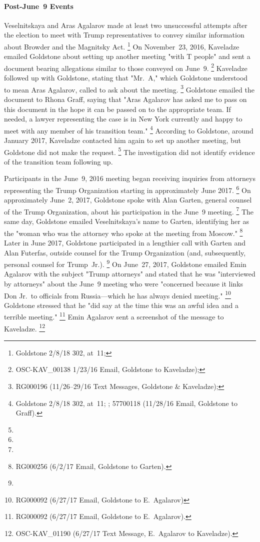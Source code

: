 \paragraph{Post-June~9 Events}

Veselnitskaya and Aras Agalarov made at least two unsuccessful attempts after the election to meet with Trump representatives to convey similar information about Browder and the Magnitsky Act.%
\footnote{Goldstone 2/8/18 302, at~11; }
On November~23, 2016, Kaveladze emailed Goldstone about setting up another meeting "with T people" and sent a document bearing allegations similar to those conveyed on June~9.%
\footnote{OSC-KAV\_00138 1/23/16 Email, Goldstone to Kaveladze); }
Kaveladze followed up with Goldstone, stating that "Mr.~A," which Goldstone understood to mean Aras Agalarov, called to ask about the meeting.%
\footnote{RG000196 (11/26--29/16 Text Messages, Goldstone \& Kaveladze); }
Goldstone emailed the document to Rhona Graff, saying that "Aras Agalarov has asked me to pass on this document in the hope it can be passed on to the appropriate team.
If needed, a lawyer representing the case is in New York currently and happy to meet with any member of his transition team."%
\footnote{Goldstone 2/8/18 302, at~11; ; 57700118 (11/28/16 Email, Goldstone to Graff).}
According to Goldstone, around January 2017, Kaveladze contacted him again to set up another meeting, but Goldstone did not make the request.%
\footnote{}
The investigation did not identify evidence of the transition team following up.

Participants in the June~9, 2016 meeting began receiving inquiries from attorneys representing the Trump Organization starting in approximately June 2017.%
\footnote{}
On approximately June~2, 2017, Goldstone spoke with Alan Garten, general counsel of the Trump Organization, about his participation in the June~9 meeting.%
\footnote{}
The same day, Goldstone emailed Veselnitskaya's name to Garten, identifying her as the "woman who was the attorney who spoke at the meeting from Moscow."%
\footnote{RG000256 (6/2/17 Email, Goldstone to Garten).}
Later in June 2017, Goldstone participated in a lengthier call with Garten and Alan Futerfas, outside counsel for the Trump Organization (and, subsequently, personal counsel for Trump~Jr.).%
\footnote{}
On June~27, 2017, Goldstone emailed Emin Agalarov with the subject "Trump attorneys" and stated that he was "interviewed by attorneys" about the June~9 meeting who were "concerned because it links Don Jr.\ to officials from Russia---which he has always denied meeting."%
\footnote{RG000092 (6/27/17 Email, Goldstone to E.~Agalarov)}
Goldstone stressed that he "did say at the time this was an awful idea and a terrible meeting."%
\footnote{RG000092 (6/27/17 Email, Goldstone to E.~Agalarov). }
Emin Agalarov sent a screenshot of the message to Kaveladze.%
\footnote{OSC-KAV\_01190 (6/27/17 Text Message, E.~Agalarov to Kaveladze).}

